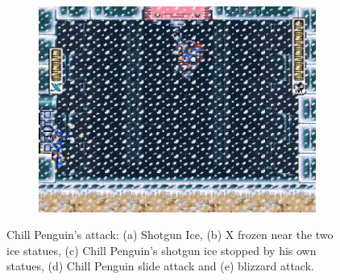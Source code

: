 \begin{figure}[h]
\begin{subfigure}{0.49\textwidth}
		\caption{}
	\end{subfigure}\\
	\begin{subfigure}{0.5\textwidth}
		\centering
		\includegraphics[width=\linewidth]{figures/X1/Chill_blizzard.jpg}
		\caption{}
		
	\end{subfigure}
	\caption{Chill Penguin's attack: (a) Shotgun Ice, (b) X frozen near the two ice statues, (c) Chill Penguin's shotgun ice stopped by his own statues, (d) Chill Penguin slide attack and (e) blizzard attack.}
	
\end{figure}
